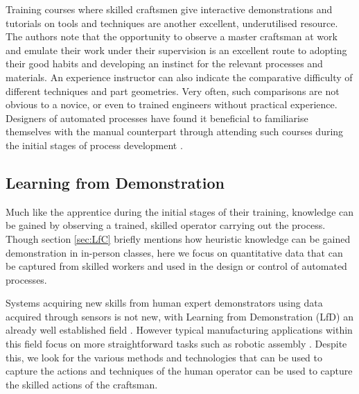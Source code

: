 Training courses where skilled craftsmen give interactive demonstrations and tutorials on tools and techniques are another excellent, underutilised resource. The authors note that the opportunity to observe a master craftsman at work and emulate their work under their supervision is an excellent route to adopting their good habits and developing an instinct for the relevant processes and materials. An experience instructor can also indicate the comparative difficulty of different techniques and part geometries. Very often, such comparisons are not obvious to a novice, or even to trained engineers without practical experience. Designers of automated processes have found it beneficial to familiarise themselves with the manual counterpart through attending such courses during the initial stages of process development \citep{Ilangovan2016AnForming}.

%

\subsection{Learning from Demonstration} \label{sec:LfD} 
Much like the apprentice during the initial stages of their training, knowledge can be gained by observing a trained, skilled operator carrying out the process. Though section \ref{sec:LfC} briefly mentions how heuristic knowledge can be gained demonstration in in-person classes, here we focus on quantitative data that can be captured from skilled workers and used in the design or control of automated processes.

Systems acquiring new skills from human expert demonstrators using data acquired through sensors is not new, with Learning from Demonstration (LfD)  an already well established field \citep{Ravichandar2020RecentDemonstration}. 
However typical manufacturing applications within this field focus on more straightforward tasks such as robotic assembly \citep{Zhu2018RobotSurvey}. Despite this, we look for the various methods and technologies that can be used to capture the actions and techniques of the human operator can be used to capture the skilled actions of the craftsman.

